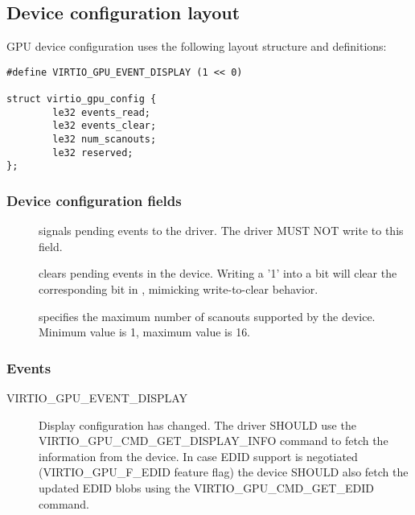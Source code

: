 \subsection{Device configuration layout}\label{sec:Device Types / GPU Device / Device configuration layout}

GPU device configuration uses the following layout structure and
definitions:

\begin{lstlisting}
#define VIRTIO_GPU_EVENT_DISPLAY (1 << 0)

struct virtio_gpu_config {
        le32 events_read;
        le32 events_clear;
        le32 num_scanouts;
        le32 reserved;
};
\end{lstlisting}

\subsubsection{Device configuration fields}

\begin{description}
\item[] signals pending events to the driver.  The
  driver MUST NOT write to this field.
\item[] clears pending events in the device.
  Writing a '1' into a bit will clear the corresponding bit in
  , mimicking write-to-clear behavior.
\item[] specifies the maximum number of scanouts
  supported by the device.  Minimum value is 1, maximum value is 16.
\end{description}

\subsubsection{Events}

\begin{description}
\item[VIRTIO_GPU_EVENT_DISPLAY] Display configuration has changed.
  The driver SHOULD use the VIRTIO_GPU_CMD_GET_DISPLAY_INFO command to
  fetch the information from the device.  In case EDID support is
  negotiated (VIRTIO_GPU_F_EDID feature flag) the device SHOULD also
  fetch the updated EDID blobs using the VIRTIO_GPU_CMD_GET_EDID
  command.
\end{description}


